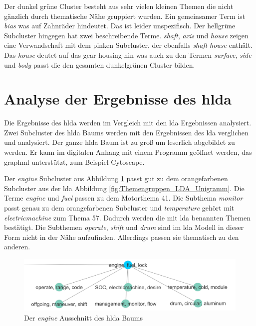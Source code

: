 Der dunkel grüne Cluster besteht aus sehr vielen kleinen Themen die nicht gänzlich durch thematische Nähe gruppiert wurden. Ein gemeinsamer Term ist \emph{bias} was auf Zahnräder hindeutet. Das ist leider unspezifisch. Der hellgrüne Subcluster hingegen hat zwei beschreibende Terme. \emph{shaft}, \emph{axis} und \emph{house} zeigen eine Verwandschaft mit dem pinken Subcluster, der ebenfalls \emph{shaft} \emph{house} enthält. Das \emph{house} deutet auf das gear housing hin was auch zu den Termen \emph{surface}, \emph{side} und \emph{body} passt die den gesamten dunkelgrünen Cluster bilden.
 
 
 
 
 
 
 
 


\section{Analyse der Ergebnisse des \gls{hlda}}

Die Ergebnisse des \gls{hlda} werden im Vergleich mit den \gls{lda} Ergebnissen analysiert. Zwei Subcluster des \gls{hlda} Baums werden mit den Ergebnissen des \gls{lda} verglichen und analysiert. Der ganze \gls{hlda} Baum ist zu groß um leserlich abgebildet zu werden. Er kann im digitalen Anhang mit einem Programm geöffnet werden, das graphml unterstützt, zum Beispiel Cytoscape.

Der \emph{engine} Subcluster aus Abbildung \ref{fig:hlda_engine} passt gut zu dem orangefarbenen Subcluster aus der \gls{lda} Abbildung \ref{fig:Themengruppen_LDA_Unigramm}. Die Terme \emph{engine} und \emph{fuel} passen zu dem Motorthema 41. Die Subthema \emph{monitor} passt genau zu dem orangefarbenen Subcluster und \emph{temperature} gehört mit \emph{electricmachine} zum Thema 57. Dadurch werden die mit \gls{lda} benannten Themen bestätigt. Die Subthemen \emph{operate}, \emph{shift} und \emph{drum} sind im \gls{lda} Modell in dieser Form nicht in der Nähe aufzufinden. Allerdings passen sie thematisch zu den anderen.

\begin{figure}[htpb]
	\centering
	\includegraphics[width=\textwidth,keepaspectratio=true]{img/hldaEngine.png}
	\caption{
		Der \emph{engine} Ausschnitt des \gls{hlda} Baums
	}
	\label{fig:hlda_engine}
\end{figure}

